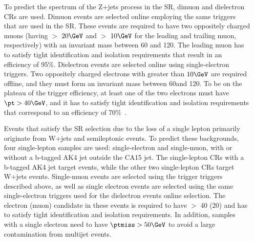 To predict the \MET spectrum of the Z+jets process in the SR, dimuon and dielectron CRs are used.
Dimuon events are selected online employing the same \MET triggers that are used in the SR.
These events are required to have two oppositely charged muons (having
\pt $>$ $20\GeV$ and \pt $>$ $10\GeV$ for the leading and trailing
muon, respectively) with an invariant mass between 60 and 120\GeV.
The leading muon has to satisfy tight identification and isolation requirements that result in an efficiency of 95\%.
Dielectron events are selected online using single-electron triggers. %
Two oppositely charged electrons with \pt greater than $10\GeV$ are required offline, and they must form an invariant mass between 60\GeV and 120\GeV.
To be on the plateau of the trigger efficiency, at least one of the two electrons must have $\pt>40\GeV$, and it has to satisfy tight identification and isolation requirements that correspond to an efficiency of 70\%~\cite{Khachatryan:2015hwa}.

Events that satisfy the SR selection due to the loss of a single lepton primarily originate from W+jets and semileptonic \ttbar events.
To predict these backgrounds, four single-lepton samples are used: single-electron and single-muon, with or without a b-tagged AK4 jet outside the CA15 jet.
The single-lepton CRs with a b-tagged AK4 jet target \ttbar events, while the other two single-lepton CRs target W+jets events.
Single-muon events are selected using the \MET trigger triggers described above, as well as single electron events are selected using the same single-electron triggers used for the dielectron events online selection.
The electron (muon) candidate in these events is required to have \pt $>$ 40 (20) \GeV and has to satisfy tight identification and isolation requirements.
In addition, samples with a single electron need to have $\ptmiss>50\GeV$ to avoid a large contamination from multijet events.

